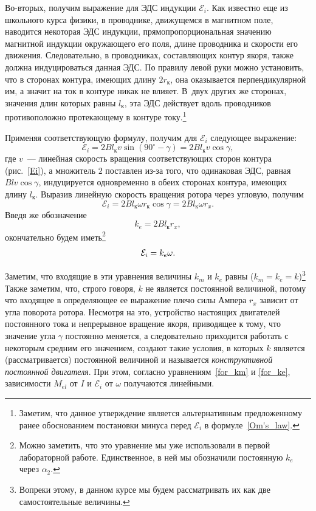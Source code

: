 \documentclass[12pt, a4paper, openany]{extarticle}
\begin{document}
Во-вторых, получим выражение для ЭДС индукции $\mathcal E_i$.
Как известно еще из школьного курса физики, в проводнике, движущемся в магнитном поле, наводится некоторая ЭДС индукции, прямопропорциональная значению магнитной индукции окружающего его поля, длине проводника и скорости его движения. 
Следовательно, в проводниках, составляющих контур якоря, также должна индуцироваться данная ЭДС.
По правилу левой руки можно установить, что в сторонах контура, имеющих длину $2r_\text{к}$, она оказывается перпендикулярной им, а значит на ток в контуре никак не влияет.
В~двух других же сторонах, значения длин которых равны $l_\text{к}$, эта ЭДС действует вдоль проводников противоположно протекающему в контуре току\lefteqn.\footnote{Заметим, что данное утверждение является альтернативным предложенному ранее обоснованием постановки минуса перед $\mathcal E_i$ в формуле~\eqref{Om's_law}.}

Применяя соответствующую формулу, получим для $\mathcal E_i$ следующее выражение:
\begin{equation}
	\mathcal E_i = 2Bl_\text{к}v\sin(90^\circ-\gamma) = 2Bl_\text{к}v\cos\gamma,
\end{equation}
где $v$~--- линейная скорость вращения соответствующих сторон контура (рис.~\ref{Ei}), а множитель $2$ поставлен из-за того, что одинаковая ЭДС, равная $Blv\cos\gamma$, индуцируется одновременно в обеих сторонах контура, имеющих длину $l_\text{к}$. 
Выразив линейную скорость вращения ротора через угловую, получим
\begin{equation}
	\mathcal E_i = 2Bl_\text{к}\omega r_\text{к}\cos\gamma = 2Bl_\text{к}\omega r_x.
\end{equation}
Введя же обозначение 
\begin{equation}\label{constr_const_ke}
	k_e = 2Bl_\text{к}r_x,
\end{equation}
окончательно будем иметь\footnote{Можно заметить, что это уравнение мы уже использовали в первой лабораторной работе. Единственное, в ней мы обозначили постоянную $k_e$ через $\alpha_2$.}
\begin{equation}\label{for_ke}
	\mathcal E_i = k_e\omega\ldotp
\end{equation}

Заметим, что входящие в эти уравнения величины $k_m$ и $k_e$ равны ($ k_m=k_e=k$)\footnote{Вопреки этому, в данном курсе мы будем рассматривать их как две самостоятельные величины.}
Также заметим, что, строго говоря, $k$ не является постоянной величиной, потому что входящее в определяющее ее выражение плечо силы Ампера $r_x$ зависит от угла поворота ротора.
Несмотря на это, устройство настоящих двигателей постоянного тока и непрерывное вращение якоря, приводящее к тому, что значение угла $\gamma$ постоянно меняется, а следовательно приходится работать с некоторым средним его значением, создают такие условия, в которых $k$ является (рассматривается) постоянной величиной и называется \textit{конструктивной постоянной двигателя}.
При этом, согласно уравнениям~\eqref{for_km} и \eqref{for_ke}, зависимости $M_{el}$ от $I$ и $\mathcal E_i$ от $\omega$ получаются линейными.
\end{document}

